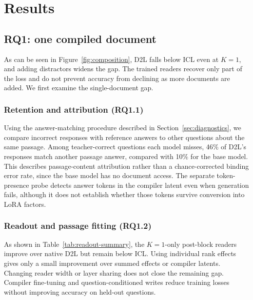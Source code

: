 \section{Results}
\label{sec:results}

\subsection{RQ1: one compiled document}
\label{sec:res-single}
As can be seen in Figure~\ref{fig:composition}, D2L falls below ICL even at
$K=1$, and adding distractors widens the gap. The trained readers recover only
part of the loss and do not prevent accuracy from declining as more documents
are added. We first examine the single-document gap.



\subsubsection{Retention and attribution (RQ1.1)}
Using the answer-matching procedure described in Section~\ref{sec:diagnostics},
we compare incorrect responses with reference answers to other questions about
the same passage. Among teacher-correct questions each model misses, 46\% of
D2L's responses match another passage answer, compared with 10\% for the base
model. This describes passage-content attribution rather than a chance-corrected
binding error rate, since the base model has no document access.
The separate token-presence probe detects answer tokens in the
compiler latent even when generation fails, although it does not establish
whether those tokens survive conversion into LoRA factors.

\subsubsection{Readout and passage fitting (RQ1.2)}
As shown in Table~\ref{tab:readout-summary}, the $K=1$-only post-block readers
improve over native D2L but remain below ICL. Using individual rank effects
gives only a small improvement over summed effects or compiler latents.
Changing reader width or layer sharing does not close the remaining gap.
Compiler fine-tuning and
question-conditioned writes reduce training losses without improving
accuracy on held-out questions.

